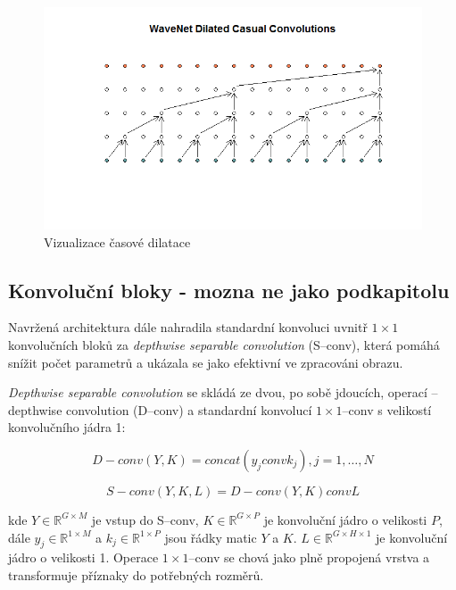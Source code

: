\begin{figure}[H]
    \centering
    \includegraphics[scale=0.5]{obrazky-figures/causal_dilation.png}
    \caption{\label{fig:tasnet-causal-dilation}Vizualizace časové dilatace}
\end{figure}



\subsection{Konvoluční bloky - mozna ne jako podkapitolu}
Navržená architektura dále nahradila standardní konvoluci uvnitř $1 \times 1$ konvolučních bloků za \textit{depthwise separable convolution} (S--conv), která pomáhá snížit počet parametrů a ukázala se jako efektivní ve zpracováni obrazu.

\textit{Depthwise separable convolution} se skládá ze dvou, po sobě jdoucích, operací -- depthwise convolution (D--conv) a standardní konvolucí $1 \times 1$--conv s velikostí konvolučního jádra 1:

\begin{equation}
	D-conv(Y, K) = concat(y_j conv k_j), j = 1, \dots, N
\end{equation}

\begin{equation}
	S-conv(Y, K, L) = D-conv(Y, K) conv L
\end{equation}

kde $Y \in \mathbb{R}^{G \times M}$ je vstup do S--conv, $K \in \mathbb{R}^{G \times P}$ je konvoluční jádro o velikosti $P$, dále $y_j \in \mathbb{R}^{1 \times M}$ a $k_j \in \mathbb{R}^{1 \times P}$ jsou řádky matic $Y$ a $K$. $L \in \mathbb{R}^{G \times H \times 1}$ je konvoluční jádro o velikosti 1. Operace $1 \times 1$--conv se chová jako plně propojená vrstva a transformuje příznaky do potřebných rozměrů.


